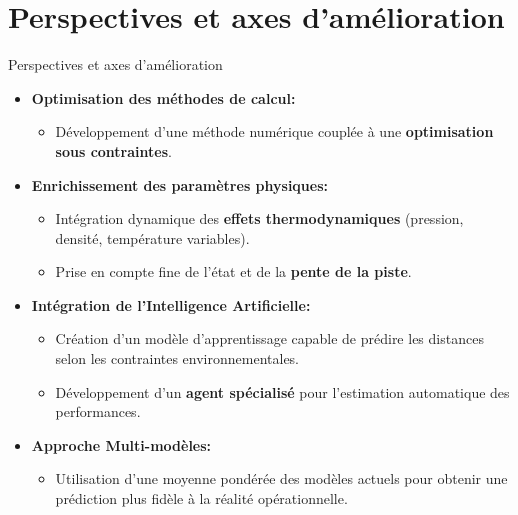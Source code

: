 	
	
	
	
	
	
	\section{Perspectives et axes d'amélioration}
	
	\begin{frame}{Perspectives et axes d'amélioration}
		\begin{itemize}
			\item \textbf{Optimisation des méthodes de calcul:}
			\begin{itemize}
				\item Développement d'une méthode numérique couplée à une \textbf{optimisation sous contraintes}.
			\end{itemize}
			\item \textbf{Enrichissement des paramètres physiques:}
			\begin{itemize}
				\item Intégration dynamique des \textbf{effets thermodynamiques} (pression, densité, température variables).
				\item Prise en compte fine de l'état et de la \textbf{pente de la piste}.
			\end{itemize}
			\item \textbf{Intégration de l'Intelligence Artificielle:}
			\begin{itemize}
				\item Création d'un modèle d'apprentissage capable de prédire les distances selon les contraintes environnementales.
				\item Développement d'un \textbf{agent spécialisé} pour l'estimation automatique des performances.
			\end{itemize}
			\item \textbf{Approche Multi-modèles:}
			\begin{itemize}
				\item Utilisation d'une moyenne pondérée des modèles actuels pour obtenir une prédiction plus fidèle à la réalité opérationnelle.
			\end{itemize}
		\end{itemize}
	\end{frame}
	
	
	
